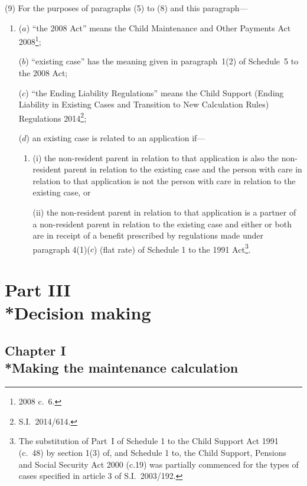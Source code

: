 \documentclass[12pt,a4paper]{article}
\begin{document}
(9) For the purposes of paragraphs (5) to (8) and this paragraph—
\begin{enumerate}\item[]
($a$) “the 2008 Act” means the Child Maintenance and Other Payments Act 2008\footnote{2008 c.~6.};

\begin{sloppypar}
($b$) “existing case” has the meaning given in paragraph~1(2) of Schedule~5 to the 2008 Act;
\end{sloppypar}

($c$) “the Ending Liability Regulations” means the Child Support (Ending Liability in Existing Cases and Transition to New Calculation Rules) Regulations 2014\footnote{S.I.~2014/614.};

($d$) an existing case is related to an application if—
\begin{enumerate}\item[]
(i) the non-resident parent in relation to that application is also the non-resident parent in relation to the existing case and the person with care in relation to that application is not the person with care in relation to the existing case, or

(ii) the non-resident parent in relation to that application is a partner of a non-resident parent in relation to the existing case and either or both are in receipt of a benefit prescribed by regulations made under paragraph 4(1)($c$)  (flat rate) of Schedule 1 to the 1991 Act\footnote{The substitution of Part~I of Schedule 1 to the Child Support Act 1991 (c.~48) by section 1(3) of, and Schedule 1 to, the Child Support, Pensions and Social Security Act 2000 (c.19) was partially commenced for the types of cases specified in article 3 of S.I.~2003/192.}.
\end{enumerate}
\end{enumerate}


\section[Part III --- Decision making]{Part III\\*Decision making}

\subsection[Chapter I --- Making the maintenance calculation]{Chapter I\\*Making the maintenance calculation}
\end{document}
